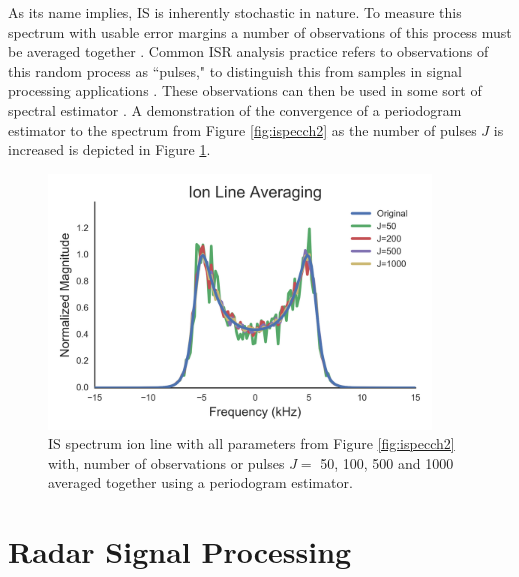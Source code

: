 As its name implies, IS is inherently stochastic in nature. To measure this spectrum with usable error margins a number of observations of this process must be averaged together \cite{Diaz:2008co}. Common ISR analysis practice refers to observations of this random process as ``pulses," to distinguish this from samples in signal processing applications \cite{dtsp:openhiem}. These observations can then be used in some sort of spectral estimator . A demonstration of the convergence of a periodogram estimator to the spectrum from Figure \ref{fig:ispecch2} as the number of pulses $J$ is increased is depicted in Figure \ref{fig:ispecch2ave}.
\begin{figure}[htb]
\centering
\includegraphics[width=4in]{Specionave}
\caption{IS spectrum ion line with all parameters from Figure \ref{fig:ispecch2} with, number of observations or pulses $J =$ 50, 100, 500 and 1000 averaged together using a periodogram estimator. }
\label{fig:ispecch2ave}
\end{figure}

\section{Radar Signal Processing}

